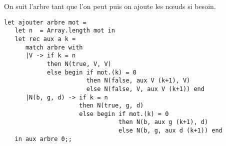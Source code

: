 \begin{Exercise}On suit l'arbre tant que l'on peut puis on ajoute les nœuds si besoin. 

\newpage
\begin{lstlisting}
let ajouter arbre mot =
   let n  = Array.length mot in
   let rec aux a k =
      match arbre with
      |V -> if k = n
            then N(true, V, V)
            else begin if mot.(k) = 0
                       then N(false, aux V (k+1), V)
                       else N(false, V, aux V (k+1)) end
      |N(b, g, d) -> if k = n
                     then N(true, g, d)
                     else begin if mot.(k) = 0
                                then N(b, aux g (k+1), d)
                                else N(b, g, aux d (k+1)) end
   in aux arbre 0;;
\end{lstlisting}
\end{Exercise} 
